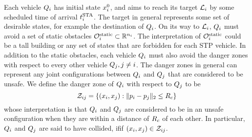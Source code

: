 

Each vehicle $Q_i$ has initial state $x^0_i$, and aims to reach its target $\mathcal{L}_i$ by some scheduled time of arrival $t^\text{STA}_i$. The target in general represents some set of desirable states, for example the destination of $Q_i$. %
On its way to $\mathcal{L}_i$, $Q_i$ must avoid a set of static obstacles $\mathcal{O}^\text{static}_i \subset \mathbb{R}^{n_i}$. The interpretation of $\mathcal{O}^\text{static}_i$ could be a tall building or any set of states that are forbidden for each STP vehicle. In addition to the static obstacles, each vehicle $Q_i$ must also avoid the danger zones with respect to every other vehicle $Q_j, j\neq i$. The danger zones in general can represent any joint configurations between $Q_i$ and $Q_j$ that are considered to be unsafe. We define the danger zone of $Q_i$ with respect to $Q_j$ to be
%
\begin{equation}
\mathcal{Z}_{ij} = \{(x_i, x_j): \|p_i - p_j\|_2 \le R_c\}
\end{equation}
%
\noindent whose interpretation is that $Q_i$ and $Q_j$ are considered to be in an unsafe configuration when they are within a distance of $R_c$ of each other. In particular, $Q_i$ and $Q_j$ are said to have collided, ifif $(x_i, x_j) \in \mathcal{Z}_{ij}$.

